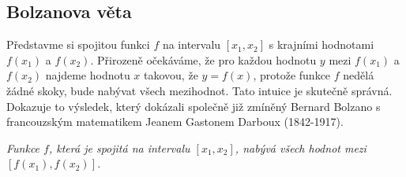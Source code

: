 \subsection*{Bolzanova věta}

Představme si spojitou funkci $f$ na intervalu $[x_1,x_2]$ s krajními hodnotami $f(x_1)$ a $f(x_2)$. Přirozeně očekáváme, že pro každou hodnotu $y$ mezi $f(x_1)$ a $f(x_2)$ najdeme hodnotu $x$ takovou, že $y=f(x)$, protože funkce $f$ nedělá žádné skoky, bude nabývat všech mezihodnot. Tato intuice je skutečně správná. Dokazuje to výsledek, který dokázali společně již zmíněný Bernard Bolzano s francouzským matematikem Jeanem Gastonem Darboux (1842-1917).



\textit{Funkce $f$, která je spojitá na intervalu $[x_1,x_2]$, nabývá všech hodnot mezi $[f(x_1),f(x_2)]$.}